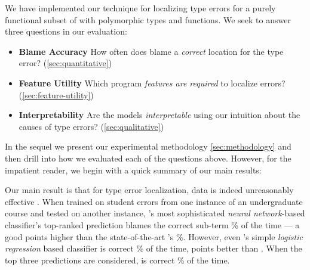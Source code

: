\label{sec:evaluation}


We have implemented our technique for localizing type errors for a
purely functional subset of \ocaml with polymorphic types and functions.
%
We seek to answer three questions in our evaluation:
%
\begin{itemize}
\item \textbf{Blame Accuracy}
  How often does \toolname
  blame a \emph{correct}
  location for the type error?
  (\autoref{sec:quantitative})
\item \textbf{Feature Utility}
  Which program \emph{features are required}
  to localize errors?
   (\autoref{sec:feature-utility})
\item \textbf{Interpretability}
  Are the models \emph{interpretable} using
  our intuition about the causes of type errors?
  (\autoref{sec:qualitative})
\end{itemize}
%
%
In the sequel we present our experimental
methodology \autoref{sec:methodology} and
then drill into how we evaluated each of
the questions above.
%
However, for the impatient reader, we begin
with a quick summary of our main results:
%
%
%

Our main result is that for type error
localization, data is indeed unreasonably
effective \citep{halevy09}.
%
When trained on student errors from one
instance of an undergraduate course and
tested on another instance,
\toolname's most sophisticated
\emph{neural network}-based
classifier's top-ranked
prediction blames the correct
sub-term \HiddenFhTopOne\% of the time
--- a good \ToolnameWinSherrloc points
higher than the state-of-the-art
\sherrloc's \SherrlocTopOne\%.
%
However, even \toolname's simple
\emph{logistic regression} based
classifier is correct \LinearTopOne\% of the time,
\ie \LinearWinSherrloc points better than \sherrloc.
%
When the top three predictions are considered,
\toolname is correct \HiddenFhTopThree\% of the time.

